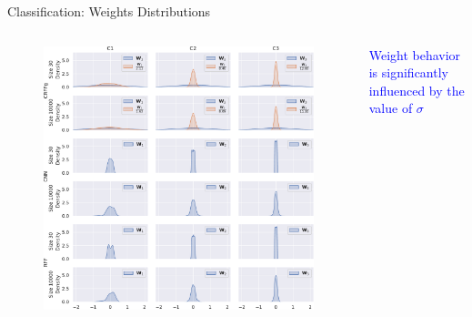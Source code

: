 \documentclass[aspectratio=169]{beamer}
\begin{document}
\begin{frame}{Classification: Weights Distributions}

\begin{columns}
 \begin{figure}
    \centering
    \includegraphics[width=0.85\linewidth]{Figures/weightsDist.pdf}
    \end{figure}


\begin{center}
        \textcolor{blue}{Weight behavior is significantly influenced by the value of $\sigma$}    
    \end{center}
\end{columns}
    
\end{frame}
\end{document}
